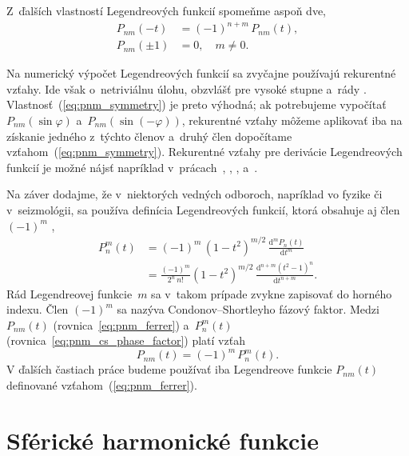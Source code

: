 \documentclass[a4paper, 12pt]{book}
\newcommand{\diff}{\mathrm d}
\begin{document}
Z~ďalších vlastností Legendreových funkcií spomeňme aspoň dve,
%
\begin{align}
\label{eq:pnm_symmetry}
P_{nm}(-t) &= (-1)^{n + m} \, P_{nm}(t){,}\\
%
P_{nm}(\pm1) &= 0{,} \quad m \neq 0{.}
\end{align}

Na numerický výpočet Legendreových funkcií sa zvyčajne používajú rekurentné 
vzťahy.  Ide však o~netriviálnu úlohu, obzvlášť pre vysoké stupne a~rády 
\parencite{Holmes2002a,Fukushima2012a,Ishioka2018}.  
Vlastnosť~(\ref{eq:pnm_symmetry}) je preto výhodná; ak potrebujeme vypočítať 
$P_{nm}(\sin\varphi)$ a~$P_{nm}(\sin(-\varphi))$, rekurentné vzťahy môžeme 
aplikovať iba na získanie jedného z~týchto členov a~druhý člen dopočítame 
vzťahom~(\ref{eq:pnm_symmetry}).  Rekurentné vzťahy pre derivácie Legendreových 
funkcií je možné nájsť napríklad v~prácach~\textcite{Tscherning1976b}, 
\textcite{Bosch2000}, \textcite{Holmes2002a}, \textcite{Freeden2009} 
a~\textcite{Fukushima2012b}.

Na záver dodajme, že v~niektorých vedných odboroch, napríklad vo fyzike či 
v~seizmológii, sa používa definícia Legendreových funkcií, ktorá obsahuje aj 
člen~$(-1)^m$ \parencite{Wieczorek2015,Olver2010},
%
\begin{equation}
\label{eq:pnm_cs_phase_factor}
\begin{split}
P_n^m(t) &= (-1)^m \, (1 - t^2)^{m \slash 2} \, \frac{\diff^m P_n(t)}{\diff 
t^m}\\
%
&= \frac{(-1)^m}{2^n \, n!} (1 - t^2)^{ m \slash 2} \, \frac{\diff^{n + m}
(t^2 - 1)^n}{\diff t^{n + m}}{.}
\end{split}
\end{equation}
%
Rád Legendreovej funkcie~$m$ sa v~takom prípade zvykne zapisovať do horného 
indexu.  Člen $(-1)^{m}$ sa nazýva Condonov--Shortleyho fázový faktor.  Medzi 
$P_{nm}(t)$ (rovnica~\ref{eq:pnm_ferrer}) a~$P_n^m(t)$ 
(rovnica~\ref{eq:pnm_cs_phase_factor}) platí vzťah
%
\begin{equation}
P_{nm}(t) = (-1)^m \, P_n^m(t){.}
\end{equation}
%
V ďalších častiach práce budeme používať iba Legendreove funkcie $P_{nm}(t)$ 
definované vzťahom~(\ref{eq:pnm_ferrer}).




\section{Sférické harmonické funkcie}
\label{sec:spherical_harmonics}
\end{document}
